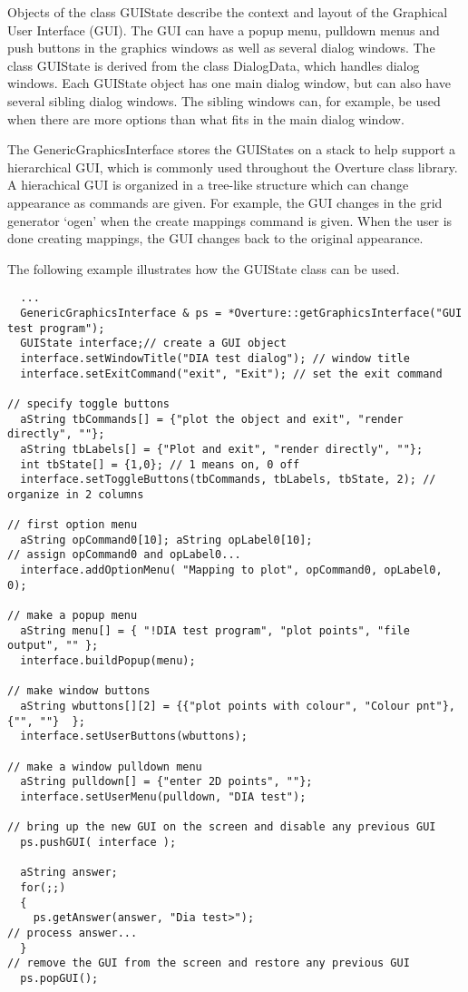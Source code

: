 \documentclass{article}
\begin{document}
Objects of the class GUIState describe the context and layout of the
Graphical User Interface (GUI). The GUI can have a popup menu,
pulldown menus and push buttons in the graphics windows as well as
several dialog windows. The class GUIState is derived from the class
DialogData, which handles dialog windows. Each GUIState object has one
main dialog window, but can also have several sibling dialog
windows. The sibling windows can, for example, be used when there are
more options than what fits in the main dialog window.

The GenericGraphicsInterface stores the GUIStates on a stack to help
support a hierarchical GUI, which is commonly used throughout the
Overture class library. A hierachical GUI is organized in a tree-like
structure which can change appearance as commands are given. For
example, the GUI changes in the grid generator `ogen' when the create
mappings command is given. When the user is done creating mappings,
the GUI changes back to the original appearance.

The following example illustrates how the GUIState class can be used.
\begin{verbatim}
  ...
  GenericGraphicsInterface & ps = *Overture::getGraphicsInterface("GUI test program"); 
  GUIState interface;// create a GUI object
  interface.setWindowTitle("DIA test dialog"); // window title
  interface.setExitCommand("exit", "Exit"); // set the exit command  

// specify toggle buttons
  aString tbCommands[] = {"plot the object and exit", "render directly", ""};
  aString tbLabels[] = {"Plot and exit", "render directly", ""};
  int tbState[] = {1,0}; // 1 means on, 0 off
  interface.setToggleButtons(tbCommands, tbLabels, tbState, 2); // organize in 2 columns
  
// first option menu 
  aString opCommand0[10]; aString opLabel0[10];
// assign opCommand0 and opLabel0...
  interface.addOptionMenu( "Mapping to plot", opCommand0, opLabel0, 0);

// make a popup menu
  aString menu[] = { "!DIA test program", "plot points", "file output", "" };
  interface.buildPopup(menu);

// make window buttons
  aString wbuttons[][2] = {{"plot points with colour", "Colour pnt"}, {"", ""}  };
  interface.setUserButtons(wbuttons);

// make a window pulldown menu
  aString pulldown[] = {"enter 2D points", ""};
  interface.setUserMenu(pulldown, "DIA test");
  
// bring up the new GUI on the screen and disable any previous GUI
  ps.pushGUI( interface );

  aString answer;
  for(;;)
  {
    ps.getAnswer(answer, "Dia test>");
// process answer...
  }
// remove the GUI from the screen and restore any previous GUI
  ps.popGUI();
\end{verbatim}
\end{document}
